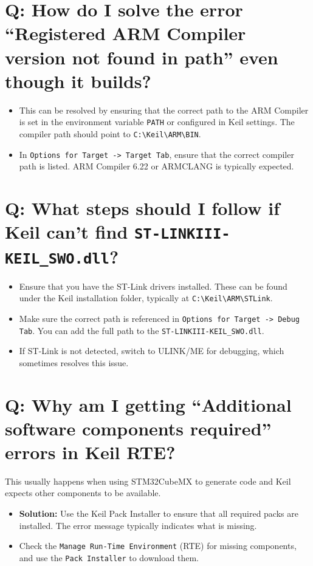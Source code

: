 \documentclass{article}
\begin{document}
\section*{Q: How do I solve the error “Registered ARM Compiler version not found in path” even though it builds?}

\begin{itemize}
    \item This can be resolved by ensuring that the correct path to the ARM Compiler is set in the environment variable \texttt{PATH} or configured in Keil settings. The compiler path should point to \texttt{C:\textbackslash{}Keil\textbackslash{}ARM\textbackslash{}BIN}.
    \item In \texttt{Options for Target -> Target Tab}, ensure that the correct compiler path is listed. ARM Compiler 6.22 or ARMCLANG is typically expected.
\end{itemize}

\section*{Q: What steps should I follow if Keil can't find \texttt{ST-LINKIII-KEIL\_SWO.dll}?}

\begin{itemize}
    \item Ensure that you have the ST-Link drivers installed. These can be found under the Keil installation folder, typically at \texttt{C:\textbackslash{}Keil\textbackslash{}ARM\textbackslash{}STLink}.
    \item Make sure the correct path is referenced in \texttt{Options for Target -> Debug Tab}. You can add the full path to the \texttt{ST-LINKIII-KEIL\_SWO.dll}.
    \item If ST-Link is not detected, switch to ULINK/ME for debugging, which sometimes resolves this issue.
\end{itemize}

\section*{Q: Why am I getting “Additional software components required” errors in Keil RTE?}

This usually happens when using STM32CubeMX to generate code and Keil expects other components to be available.
\begin{itemize}
    \item \textbf{Solution:} Use the Keil Pack Installer to ensure that all required packs are installed. The error message typically indicates what is missing. 
    \item Check the \texttt{Manage Run-Time Environment} (RTE) for missing components, and use the \texttt{Pack Installer} to download them.
\end{itemize}
\end{document}
